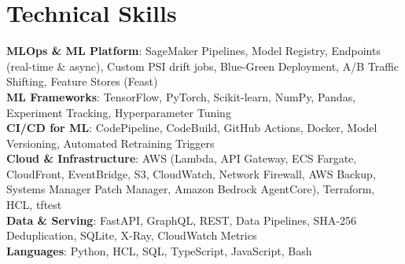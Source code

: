 \section{\textbf{Technical Skills}}
\vspace{-2pt}
\begin{itemize}[leftmargin=0.05in, label={}]
    \small{\item{
     \textbf{MLOps \& ML Platform}{: SageMaker Pipelines, Model Registry, Endpoints (real-time \& async), Custom PSI drift jobs, Blue-Green Deployment, A/B Traffic Shifting, Feature Stores (Feast)} \\
     \textbf{ML Frameworks}{: TensorFlow, PyTorch, Scikit-learn, NumPy, Pandas, Experiment Tracking, Hyperparameter Tuning} \\
     \textbf{CI/CD for ML}{: CodePipeline, CodeBuild, GitHub Actions, Docker, Model Versioning, Automated Retraining Triggers} \\
     \textbf{Cloud \& Infrastructure}{: AWS (Lambda, API Gateway, ECS Fargate, CloudFront, EventBridge, S3, CloudWatch, Network Firewall, AWS Backup, Systems Manager Patch Manager, Amazon Bedrock AgentCore), Terraform, HCL, tftest} \\
     \textbf{Data \& Serving}{: FastAPI, GraphQL, REST, Data Pipelines, SHA-256 Deduplication, SQLite, X-Ray, CloudWatch Metrics} \\
     \textbf{Languages}{: Python, HCL, SQL, TypeScript, JavaScript, Bash}
    }}
\end{itemize}
\vspace{-2mm}
